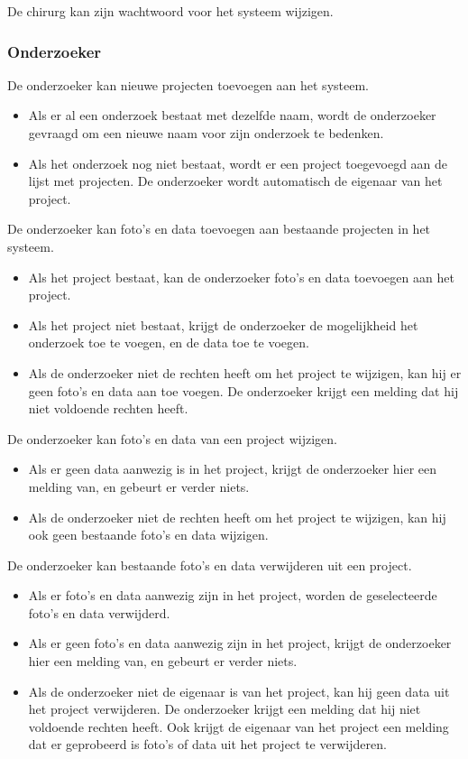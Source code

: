 De chirurg kan zijn wachtwoord voor het systeem wijzigen.

\subsubsection{Onderzoeker}

De onderzoeker kan nieuwe projecten toevoegen aan het systeem.
\begin{itemize}
	\item Als er al een onderzoek bestaat met dezelfde naam, wordt de onderzoeker gevraagd om een nieuwe naam voor zijn onderzoek te bedenken.
	\item Als het onderzoek nog niet bestaat, wordt er een project toegevoegd aan de lijst met projecten. De onderzoeker wordt automatisch de eigenaar van het project.
\end{itemize}

De onderzoeker kan foto's en data toevoegen aan bestaande projecten in het systeem.
\begin{itemize}
	\item Als het project bestaat, kan de onderzoeker foto's en data toevoegen aan het project.
	\item Als het project niet bestaat, krijgt de onderzoeker de mogelijkheid het onderzoek toe te voegen, en de data toe te voegen.
	\item Als de onderzoeker niet de rechten heeft om het project te wijzigen, kan hij er geen foto's en data aan toe voegen. De onderzoeker krijgt een melding dat hij niet voldoende rechten heeft.
\end{itemize}

De onderzoeker kan foto's en data van een project wijzigen.
\begin{itemize}
  \item Als er geen data aanwezig is in het project, krijgt de onderzoeker hier een melding van, en gebeurt er verder niets.
	\item Als de onderzoeker niet de rechten heeft om het project te wijzigen, kan hij ook geen bestaande foto's en data wijzigen.
\end{itemize}

De onderzoeker kan bestaande foto's en data verwijderen uit een project.
\begin{itemize}
	\item Als er foto's en data aanwezig zijn in het project, worden de geselecteerde foto's en data verwijderd.
	\item Als er geen foto's en data aanwezig zijn in het project, krijgt de onderzoeker hier een melding van, en gebeurt er verder niets.
	\item Als de onderzoeker niet de eigenaar is van het project, kan hij geen data uit het project verwijderen. De onderzoeker krijgt een melding dat hij niet voldoende rechten heeft. Ook krijgt de eigenaar van het project een melding dat er geprobeerd is foto's of data uit het project te verwijderen.
\end{itemize}

